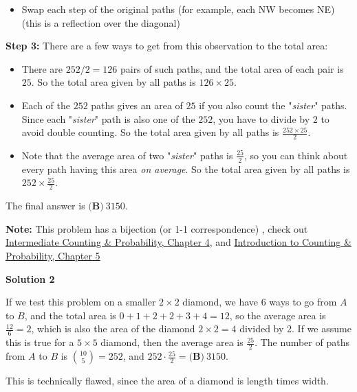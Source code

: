 \begin{enumerate}
            \begin{itemize}
        \item Swap each step of the original paths (for example, each NW becomes NE) (this is a reflection over the diagonal)
            \end{itemize}
            \textbf{Step 3:} There are a few ways to get from this observation to the total area: 

 
            \begin{itemize}
        \item There are $252/2 = 126$ pairs of such paths, and the total area of each pair is $25$.  So the total area given by all paths is $126 \times 25$.
        \item Each of the $252$ paths gives an area of $25$ if you also count the "\textit{sister}" paths. Since each "\textit{sister}" path is also one of the $252$, you have to divide by $2$ to avoid double counting.  So the total area given by all paths is $\frac{252 \times 25}{2}$.
        \item Note that the average area of two "\textit{sister}" paths is $\frac{25}{2}$, so you can think about every path having this area \textit{on average}.  So the total area given by all paths is $252 \times \frac{25}{2}$.
            \end{itemize}
            The final answer is $\boxed{\textbf{(B)}~3150}.$

 \textbf{Note:} This problem has a  bijection (or 1-1 correspondence) , check out \href{https://artofproblemsolving.com/store/book/intermediate-counting}{Intermediate Counting & Probability, Chapter 4}, and \href{https://artofproblemsolving.com//artofproblemsolving.com/store/book/intro-counting}{Introduction to Counting & Probability, Chapter 5}

 



\textbf{Solution 2}

If we test this problem on a smaller $2 \times 2$ diamond, we have $6$ ways to go from $A$ to $B$, and the total area is $0 + 1 + 2 + 2 + 3 + 4 = 12$, so the average area is $\frac{12}{6} = 2$, which is also the area of the diamond $2 \times 2 = 4$ divided by 2. If we assume this is true for a $5 \times 5$ diamond, then the average area is $\frac{25}{2}$. The number of paths from $A$ to $B$ is $\binom{10}{5} = 252$, and $252 \cdot \frac{25}{2} = \boxed{\textbf{(B)}~3150}$.

 This is technically flawed, since the area of a diamond is length times width.


\end{enumerate}
